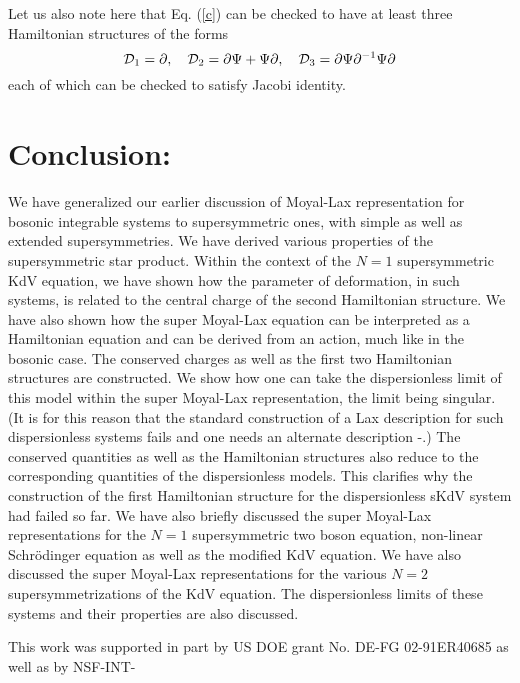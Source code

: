 \documentclass[a4paper,11pt]{article}
\begin{document}
Let us also note here that Eq. (\ref{c}) can be checked to have at
least three Hamiltonian structures of the forms
\begin{equation}
{\cal D}_{1} = \partial,\quad {\cal D}_{2} = \partial \Psi +
\Psi\partial,\quad {\cal D}_{3} =
\partial\Psi\partial^{-1}\Psi\partial
\end{equation}
each of which can be checked to satisfy Jacobi identity.

\section{Conclusion:}

We have generalized our earlier discussion of Moyal-Lax representation
for bosonic integrable systems \cite{13} to supersymmetric ones, with
simple  as
well as extended supersymmetries. We have derived various properties
of the supersymmetric star product. Within the context of the $N=1$
supersymmetric KdV equation, we have shown how the parameter of
deformation, in such systems, is related to the central charge of the
second Hamiltonian structure. We have also shown how the super
Moyal-Lax equation can be interpreted as a Hamiltonian equation and
can be derived from an action, much like in the bosonic case. The
conserved charges as well as the first two Hamiltonian structures are
constructed. We show how one can take the dispersionless limit of this
model within the super Moyal-Lax representation, the limit being
singular. (It is for this reason that the standard construction of a
Lax description for such dispersionless systems fails and one needs an
alternate description \cite{16}-\cite{17}.) The conserved quantities
as well as the Hamiltonian structures also reduce to the corresponding
quantities of the dispersionless models. This clarifies why the
construction of the first Hamiltonian structure for the dispersionless
sKdV system had failed so far. We have also briefly discussed the
super Moyal-Lax representations for the $N=1$ supersymmetric two
boson equation, non-linear Schr\"{o}dinger equation as well as the
modified KdV equation. We have also discussed the super Moyal-Lax
representations for the various $N=2$ supersymmetrizations of the KdV
equation. The dispersionless limits of these systems and their
properties are also discussed. 
  
This work was supported in part by US DOE grant No. DE-FG 02-91ER40685 as
well as by NSF-INT-
\end{document}
